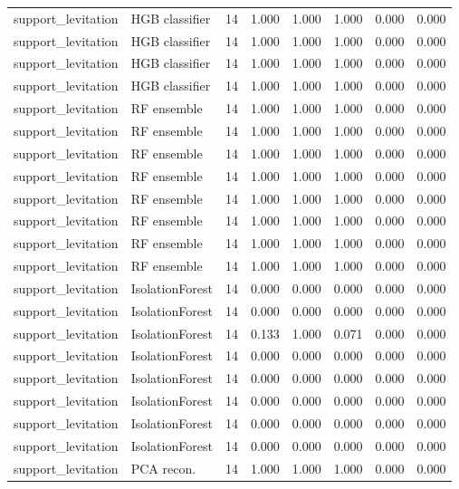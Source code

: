 {\begin{longtable}{llrrrrrr}
support\_levitation & HGB classifier & 14 & 1.000 & 1.000 & 1.000 & 0.000 & 0.000 \\
support\_levitation & HGB classifier & 14 & 1.000 & 1.000 & 1.000 & 0.000 & 0.000 \\
support\_levitation & HGB classifier & 14 & 1.000 & 1.000 & 1.000 & 0.000 & 0.000 \\
support\_levitation & HGB classifier & 14 & 1.000 & 1.000 & 1.000 & 0.000 & 0.000 \\
support\_levitation & RF ensemble & 14 & 1.000 & 1.000 & 1.000 & 0.000 & 0.000 \\
support\_levitation & RF ensemble & 14 & 1.000 & 1.000 & 1.000 & 0.000 & 0.000 \\
support\_levitation & RF ensemble & 14 & 1.000 & 1.000 & 1.000 & 0.000 & 0.000 \\
support\_levitation & RF ensemble & 14 & 1.000 & 1.000 & 1.000 & 0.000 & 0.000 \\
support\_levitation & RF ensemble & 14 & 1.000 & 1.000 & 1.000 & 0.000 & 0.000 \\
support\_levitation & RF ensemble & 14 & 1.000 & 1.000 & 1.000 & 0.000 & 0.000 \\
support\_levitation & RF ensemble & 14 & 1.000 & 1.000 & 1.000 & 0.000 & 0.000 \\
support\_levitation & RF ensemble & 14 & 1.000 & 1.000 & 1.000 & 0.000 & 0.000 \\
support\_levitation & IsolationForest & 14 & 0.000 & 0.000 & 0.000 & 0.000 & 0.000 \\
support\_levitation & IsolationForest & 14 & 0.000 & 0.000 & 0.000 & 0.000 & 0.000 \\
support\_levitation & IsolationForest & 14 & 0.133 & 1.000 & 0.071 & 0.000 & 0.000 \\
support\_levitation & IsolationForest & 14 & 0.000 & 0.000 & 0.000 & 0.000 & 0.000 \\
support\_levitation & IsolationForest & 14 & 0.000 & 0.000 & 0.000 & 0.000 & 0.000 \\
support\_levitation & IsolationForest & 14 & 0.000 & 0.000 & 0.000 & 0.000 & 0.000 \\
support\_levitation & IsolationForest & 14 & 0.000 & 0.000 & 0.000 & 0.000 & 0.000 \\
support\_levitation & IsolationForest & 14 & 0.000 & 0.000 & 0.000 & 0.000 & 0.000 \\
support\_levitation & PCA recon. & 14 & 1.000 & 1.000 & 1.000 & 0.000 & 0.000 \\

\end{longtable}}
